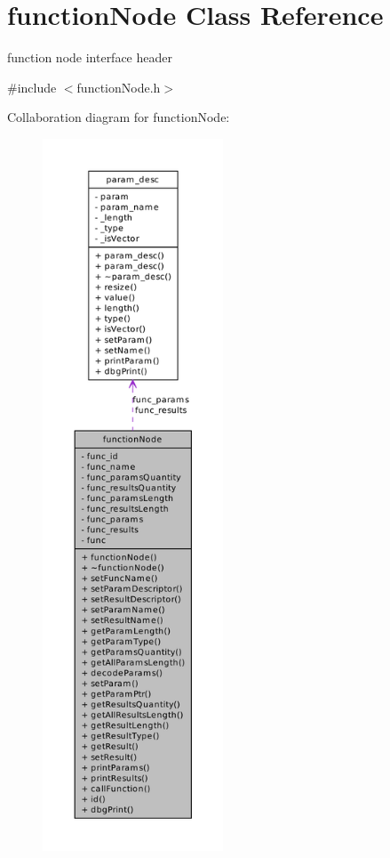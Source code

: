 \hypertarget{classfunctionNode}{
\section{functionNode Class Reference}
\label{d1/d20/classfunctionNode}
}


function node interface header  




{\ttfamily \#include $<$functionNode.h$>$}



Collaboration diagram for functionNode:\nopagebreak
\begin{figure}[H]
\begin{center}
\leavevmode
\includegraphics[height=600pt]{de/db3/classfunctionNode__coll__graph}
\end{center}
\end{figure}
